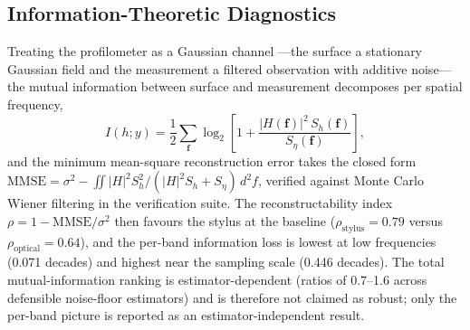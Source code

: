\documentclass{imeko_wc}
\begin{document}
\subsection{Information-Theoretic Diagnostics}
\label{sec:diagnostics}
Treating the profilometer as a Gaussian channel \cite{shannon1948mathematical,cover2006elements}---the surface a stationary Gaussian field and the measurement a filtered observation with additive noise---the mutual information between surface and measurement decomposes per spatial frequency,
\begin{equation}
I(h;y) = \frac{1}{2}\sum_{\mathbf{f}}\log_2\!\left[1 + \frac{|H(\mathbf{f})|^2\, S_h(\mathbf{f})}{S_\eta(\mathbf{f})}\right],
\end{equation}
and the minimum mean-square reconstruction error takes the closed form $\mathrm{MMSE} = \sigma^2 - \iint |H|^2 S_h^2/(|H|^2 S_h + S_\eta)\,d^2f$, verified against Monte Carlo Wiener filtering in the verification suite. The reconstructability index $\rho = 1 - \mathrm{MMSE}/\sigma^2$ then favours the stylus at the baseline ($\rho_\mathrm{stylus} = 0.79$ versus $\rho_\mathrm{optical} = 0.64$), and the per-band information loss is lowest at low frequencies (0.071 decades) and highest near the sampling scale (0.446 decades). The total mutual-information ranking is estimator-dependent (ratios of 0.7--1.6 across defensible noise-floor estimators) and is therefore not claimed as robust; only the per-band picture is reported as an estimator-independent result.
\end{document}
